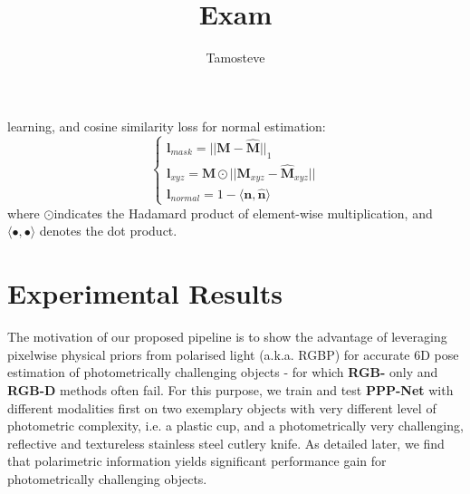 \documentclass[10pt,twocolumn,letterpaper]{article}
\begin{document}
\nocite{*}

\title{Exam}
\author{Tamosteve}
\maketitle

learning, and cosine similarity loss for normal estimation:
\begin{equation}
\left\{
    \begin{array}{ll}
        \mathbf{l}_{mask}  = ||\mathbf{M} - \mathbf{\hat{M}}||_{1}\\
        \mathbf{l}_{xyz} = \mathbf{M} \odot ||\mathbf{M}_{xyz} - \mathbf{\hat{M}}_{xyz}||\\
        \mathbf{l}_{normal} = 1 - \langle\mathbf{n},\mathbf{\hat{n}}\rangle
    \end{array}
\right.
\end{equation}
where $\odot $indicates the Hadamard product of element-wise
multiplication, and $\langle\bullet,\bullet\rangle$ denotes the dot product.

\section{Experimental Results}
The motivation of our proposed pipeline is to show the
advantage of leveraging pixelwise physical priors from polarised light (a.k.a. RGBP) for accurate 6D pose estimation
of photometrically challenging objects - for which \textbf{RGB-} only and \textbf{RGB-D} methods often fail. For this purpose, we
train and test \textbf{PPP-Net} with different modalities first on two
exemplary objects with very different level of photometric
complexity, i.e. a plastic cup, and a photometrically very
challenging, reflective and textureless stainless steel cutlery
knife. As detailed later, we find that polarimetric information yields significant performance gain for photometrically
challenging objects.
\end{document}

